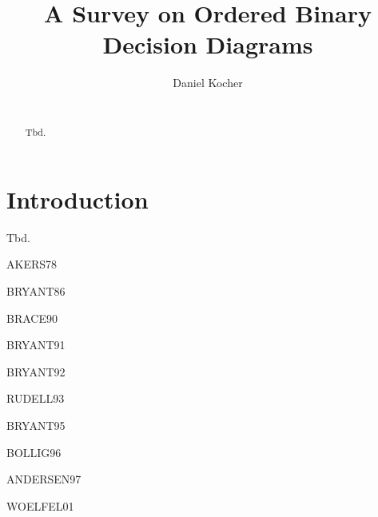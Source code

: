 \documentclass{vldb}
\begin{document}
\title{A Survey on Ordered Binary Decision Diagrams}


\author{
\alignauthor
	Daniel Kocher\\
    \\
}

\maketitle

\begin{abstract}
Tbd.
\end{abstract}

\section{Introduction}   
Tbd. \newline

\noindent AKERS78\cite{AKERS78} \newline

BRYANT86\cite{BRYANT86} \newline

\noindent BRACE90\cite{BRACE90} \newline

BRYANT91\cite{BRYANT91} \newline

\noindent BRYANT92\cite{BRYANT92} \newline

RUDELL93\cite{RUDELL93} \newline

\noindent BRYANT95\cite{BRYANT95} \newline

BOLLIG96\cite{BOLLIG96} \newline

\noindent ANDERSEN97\cite{ANDERSEN97} \newline

WOELFEL01\cite{WOELFEL01} \newline


\balance



\end{document}
